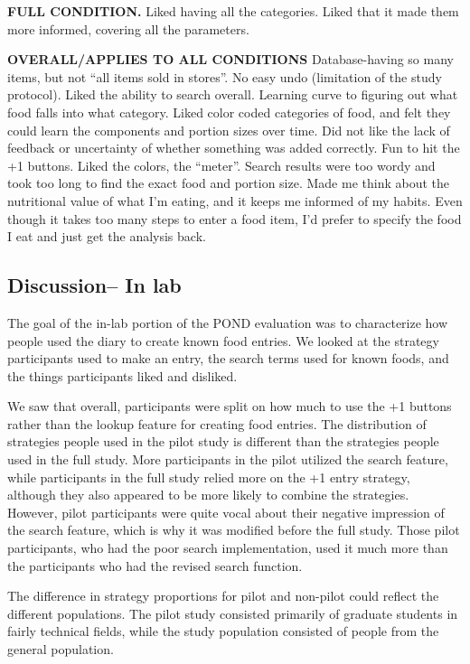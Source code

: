 \textbf{FULL CONDITION.}
Liked having all the categories. Liked that it made them more informed, covering all the parameters. 

\textbf{OVERALL/APPLIES TO ALL CONDITIONS}
Database-having so many items, but not ``all items sold in stores''. No easy undo (limitation of the study protocol). Liked the ability to search overall. Learning curve to figuring out what food falls into what category. Liked color coded categories of food, and felt they could learn the components and portion sizes over time. Did not like the lack of feedback or uncertainty of whether something was added correctly. Fun to hit the +1 buttons. Liked the colors, the ``meter''. Search results were too wordy and took too long to find the exact food and portion size. Made me think about the nutritional value of what I'm eating, and it keeps me informed of my habits. Even though it takes too many steps to enter a food item, I'd prefer to specify the food I eat and just get the analysis back. 


\subsection{Discussion-- In lab}

The goal of the in-lab portion of the POND evaluation was to characterize how people used the diary to create known food entries. We looked at the strategy participants used to make an entry, the search terms used for known foods, and the things participants liked and disliked. 

We saw that overall, participants were split on how much to use the +1 buttons rather than the lookup feature for creating food entries. The distribution of strategies people used in the pilot study is different than the strategies people used in the full study. More participants in the pilot utilized the search feature, while participants in the full study relied more on the +1 entry strategy, although they also appeared to be more likely to combine the strategies. However, pilot participants were quite vocal about their negative impression of the search feature, which is why it was modified before the full study. Those pilot participants, who had the poor search implementation, used it much more than the participants who had the revised search function. 

The difference in strategy proportions for pilot and non-pilot could reflect the different populations. The pilot study consisted primarily of graduate students in fairly technical fields, while the study population consisted of people from the general population. 

